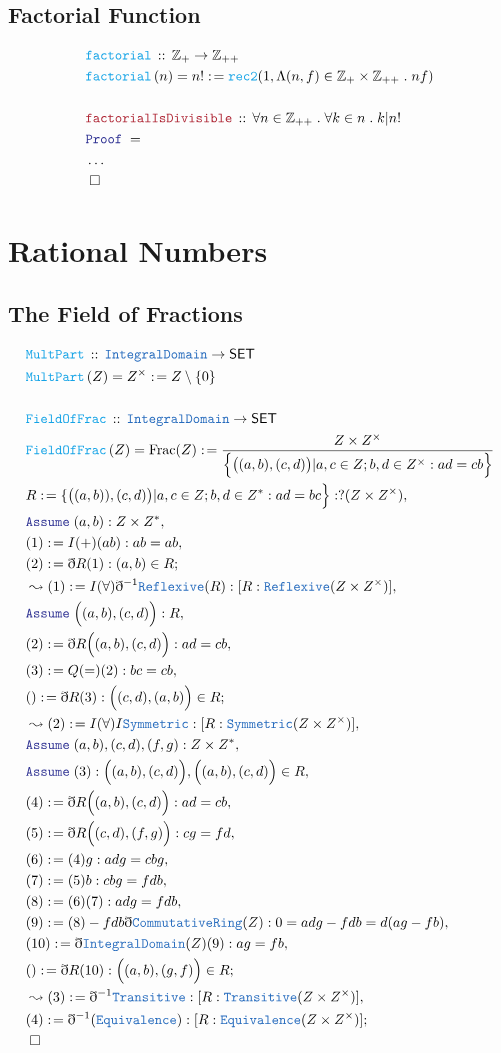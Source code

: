 \documentclass[12pt]{scrartcl}
\newcommand{\TYPE}[1]{\textcolor{NavyBlue}{\mathtt{#1}}}
\newcommand{\FUNC}[1]{\textcolor{Cerulean}{\mathtt{#1}}}
\newcommand{\LOGIC}[1]{\textcolor{Blue}{\mathtt{#1}}}
\newcommand{\THM}[1]{\textcolor{Maroon}{\mathtt{#1}}}
\renewcommand{\.}{\; . \;}
\newcommand{\de}{: \kern 0.1pc =}
\newcommand{\Act}[1]{\left( #1 \right)}
\newcommand{\Theorem}[2]{& \THM{#1} \, :: \, #2 \\ & \Proof = \\ }
\newcommand{\DeclareFunc}[2]{& \FUNC{#1} \, :: \, #2 \\}
\newcommand{\DefineNamedFunc}[4]{&  \FUNC{#1}\Act{#2} = #3 \de #4 \\}
\newcommand{\Page}[1]{ \begin{align*} #1 \end{align*}   }
\newcommand{ \bd }{ \ByDef }
\newcommand{\NoProof}{ & \ldots \\ \EndProof}
\newcommand{\Int}{\mathbb{Z} }
\newcommand{\Say}[3]{& #1 \de #2 : #3, \\}
\newcommand{\Conclude}[3]{& #1 \de #2 : #3; \\}
\newcommand{\Derive}[3]{& \leadsto #1 \de #2 : #3, \\}
\newcommand{\Assume}[2]{& \LOGIC{Assume} \; #1 : #2, \\}
\newcommand{\QED}{\; \square}
\newcommand{\EndProof}{& \QED \\}
\newcommand{\ByDef}{\eth}
\newcommand{\Proof}{\LOGIC{Proof} \; }
\newcommand{\SET}{\mathsf{SET}}
\DeclareMathOperator{\Frac}{Frac}
\begin{document}
\subsection{Factorial Function}
\Page{
	\DeclareFunc{factorial}{\Int_+ \to \Int_{++}}
	\DefineNamedFunc{factorial}{n}{n!}{\FUNC{rec2}(1,\Lambda (n,f) \in \Int_+ \times \Int_{++} \. nf)}
	\\
	\Theorem{factorialIsDivisible}{\forall n \in \Int_{++} \. \forall k \in n \. k| n!}
	\NoProof
}
\newpage
\section{Rational Numbers}
\subsection{The Field of Fractions}
\Page{
	\DeclareFunc{MultPart}{\TYPE{IntegralDomain} \to \SET}
	\DefineNamedFunc{MultPart}{Z}{Z^\times}{Z \setminus \{0\}}
	\\
	\DeclareFunc{FieldOfFrac}{\TYPE{IntegralDomain} \to \SET }
	\DefineNamedFunc{FieldOfFrac}{Z}{ \Frac(Z)}{\frac{ Z \times Z^\times}{\Big\{ \big((a,b),(c,d)\big) | a,c \in Z; b,d \in Z^\times : ad = cb \Big\}}}
	\Say{R}{\{\big((a,b)),(c,d)\big) | a,c \in Z ; b,d \in Z^* : ad = bc \Big \}}{?(Z \times Z^\times)}
	\Assume{(a,b)}{Z \times Z^*}
	\Say{(1)}{I(+)(ab)}{ab = ab}
	\Conclude{(2)}{ \bd R(1)}{(a,b) \in R}
	\Derive{(1)}{I(\forall)\bd^{-1} \TYPE{Reflexive}(R)}{ [R : \TYPE{Reflexive}(Z \times Z^\times) ]}
	\Assume{\Big((a,b),(c,d)\Big)}{R}
	\Say{(2)}{\bd R\Big((a,b),(c,d)\Big)}{ ad = cb }
	\Say{(3)}{Q(=)(2)}{bc = cb  }
	\Conclude{()}{\bd R(3)}{\Big((c,d),(a,b) \Big) \in R}
	\Derive{(2)}{I(\forall)I\TYPE{Symmetric}}{[R : \TYPE{Symmetric}(Z \times Z^\times)]}
	\Assume{(a,b),(c,d),(f,g)}{Z \times Z^*}
	\Assume{(3)}{\Big((a,b),(c,d)\Big),\Big( (a,b),(c,d) \Big)\in R }
	\Say{(4)}{\bd R\Big( (a,b),(c,d) \Big)}{ ad = cb }
	\Say{(5)}{\bd R\Big( (c,d),(f,g) \Big)}{ cg = fd}
	\Say{(6)}{(4)g}{adg =cbg}
	\Say{(7)}{(5)b}{cbg = fdb}
	\Say{(8)}{(6)(7)}{ adg = fdb  }
	\Say{(9)}{(8) - fdb \bd \TYPE{CommutativeRing}(Z) }{0 = adg - fdb = d(ag - fb) }
	\Say{(10)}{\bd \TYPE{IntegralDomain}(Z)(9) }{ag = fb}
	\Conclude{()}{\bd R(10)}{\Big((a,b),(g,f)\Big) \in R}
	\Derive{(3)}{\bd^{-1}\TYPE{Transitive}}{[R : \TYPE{Transitive}(Z \times Z^\times)]}
	\Conclude{(4)}{\bd^{-1}(\TYPE{Equivalence})}{[R : \TYPE{Equivalence}(Z \times Z^\times)]}
	\EndProof
}
\newpage
\end{document}
